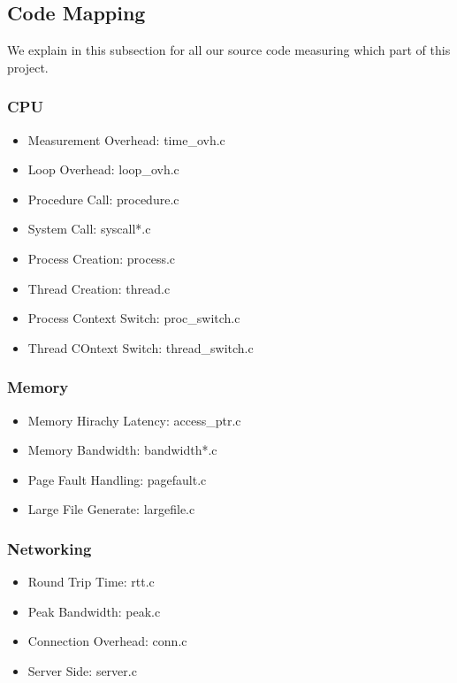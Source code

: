 \subsection{Code Mapping}

We explain in this subsection for all our source code measuring which part of this project.

\subsubsection{CPU}
\begin{itemize}
    \item Measurement Overhead: time\_ovh.c
    \item Loop Overhead: loop\_ovh.c
    \item Procedure Call: procedure.c
    \item System Call: syscall*.c
    \item Process Creation: process.c
    \item Thread Creation: thread.c
    \item Process Context Switch: proc\_switch.c
    \item Thread COntext Switch: thread\_switch.c
\end{itemize}

\subsubsection{Memory}
\begin{itemize}
    \item Memory Hirachy Latency: access\_ptr.c
    \item Memory Bandwidth: bandwidth*.c
    \item Page Fault Handling: pagefault.c
    \item Large File Generate: largefile.c
\end{itemize}

\subsubsection{Networking}
\begin{itemize}
    \item Round Trip Time: rtt.c
    \item Peak Bandwidth: peak.c
    \item Connection Overhead: conn.c
    \item Server Side: server.c
\end{itemize}

